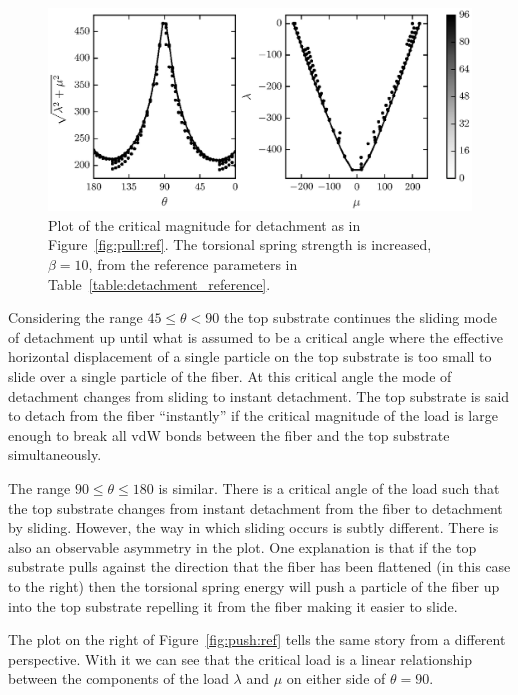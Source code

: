    \begin{figure}[t]
      \begin{center}
         \includegraphics{./fig/ch3/pull/b10/grid.eps}
      \end{center}      
      \caption{Plot of the critical magnitude for detachment as in Figure~\ref{fig:pull:ref}. The torsional spring strength is increased, $\beta=10$, from the reference parameters in Table~\ref{table:detachment_reference}.
      \label{fig:pull:b10}}
   \end{figure}

Considering the range $45 \leq \theta < 90$ the top substrate continues the sliding mode of detachment up until what is assumed to be a critical angle where the effective horizontal displacement of a single particle on the top substrate is too small to slide over a single particle of the fiber. At this critical angle the mode of detachment changes from sliding to instant detachment. The top substrate is said to detach from the fiber ``instantly'' if the critical magnitude of the load is large enough to break all vdW bonds between the fiber and the top substrate simultaneously.

The range $90 \leq \theta \leq 180$ is similar. There is a critical angle of the load such that the top substrate changes from instant detachment from the fiber to detachment by sliding. However, the way in which sliding occurs is subtly different. There is also an observable asymmetry in the plot. One explanation is that if the top substrate pulls against the direction that the fiber has been flattened (in this case to the right) then the torsional spring energy will push a particle of the fiber up into the top substrate repelling it from the fiber making it easier to slide.

The plot on the right of Figure~\ref{fig:push:ref} tells the same story from a different perspective. With it we can see that the critical load is a linear relationship between the components of the load $\lambda$ and $\mu$ on either side of $\theta=90$\textdegree.
   
